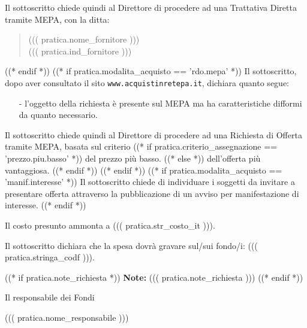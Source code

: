 \documentclass[a4paper,12pt]{letter}
\begin{document}
Il sottoscritto chiede quindi al Direttore di procedere ad una Trattativa Diretta
tramite MEPA, con la ditta:
\begin{quote}
((( pratica.nome_fornitore )))\\
((( pratica.ind_fornitore )))
\end{quote}

((* endif *))
((* if pratica.modalita_acquisto == 'rdo.mepa' *))
Il sottoscritto, dopo aver consultato il sito {\tt www.acquistinretepa.it},
dichiara quanto segue:

\begin{itemize}
\item[-] l'oggetto della richiesta \`e presente sul MEPA ma ha caratteristiche difformi
da quanto necessario.
\end{itemize}

Il sottoscritto chiede quindi al Direttore di procedere ad una Richiesta di Offerta
tramite MEPA, basata sul criterio %
   ((* if pratica.criterio_assegnazione == 'prezzo.piu.basso' *)) %
del prezzo pi\`u basso.
   ((* else *)) %
dell'offerta pi\`u vantaggiosa.
   ((* endif *))
((* endif *))
((* if pratica.modalita_acquisto == 'manif.interesse' *))
Il sottoscritto chiede di individuare i soggetti da invitare a presentare offerta
attraverso la pubblicazione di un avviso per manifestazione di interesse.
((* endif *))

Il costo presunto ammonta a ((( pratica.str_costo_it ))).

Il sottoscritto dichiara che la spesa dovr\`a gravare sul/sui fondo/i:
((( pratica.stringa_codf ))). 

((* if pratica.note_richiesta *))
{\bf Note:} ((( pratica.note_richiesta )))
((* endif *))

\vspace{0.5cm}

\begin{flushright}
\begin{minipage}[c]{6cm}
Il responsabile dei Fondi

((( pratica.nome_responsabile )))

\end{minipage}
\end{flushright}
\end{document}
